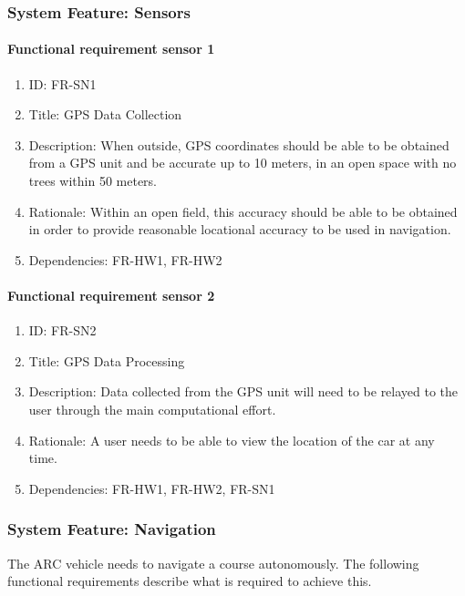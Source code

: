 \documentclass[compsoc,draftclsnofoot,onecolumn,10pt]{IEEEtran}
\begin{document}
\subsubsection{System Feature: Sensors}

	\paragraph{Functional requirement sensor 1}
    		\begin{enumerate}
    			\item ID: FR-SN1
    			\item Title: GPS Data Collection
    			\item Description: When outside, GPS coordinates should be able to be obtained from a GPS unit and be accurate up to 10 meters, in an open space with no trees within 50 meters. 
    			\item Rationale: Within an open field, this accuracy should be able to be obtained in order to provide reasonable locational accuracy to be used in navigation.
    			\item Dependencies: FR-HW1, FR-HW2
    		\end{enumerate}
		
	\paragraph{Functional requirement sensor 2}
    		\begin{enumerate}
    			\item ID: FR-SN2
    			\item Title: GPS Data Processing
    			\item Description: Data collected from the GPS unit will need to be relayed to the user through the main computational effort. 
    			\item Rationale: A user needs to be able to view the location of the car at any time. 
    			\item Dependencies: FR-HW1, FR-HW2, FR-SN1
    		\end{enumerate}

\subsubsection{System Feature: Navigation}
The ARC vehicle needs to navigate a course autonomously. The following functional
requirements describe what is required to achieve this.\par
\end{document}

